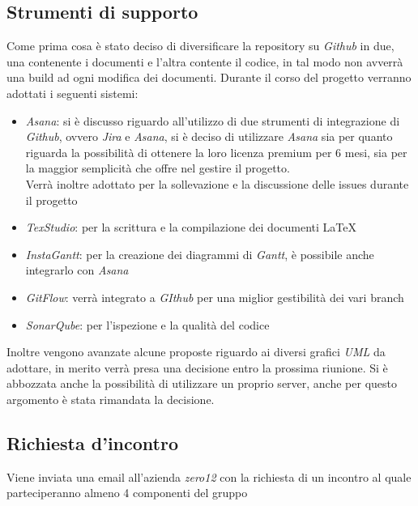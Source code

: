 \documentclass[a4paper,12pt]{article}
\begin{document}
	\subsection{Strumenti di supporto}
	Come prima cosa è stato deciso di diversificare la repository su \textit{Github} in due, una contenente i documenti e l'altra contente il codice, in tal modo non avverrà una build ad ogni modifica dei documenti.
	Durante il corso del progetto verranno adottati i seguenti sistemi:
	\begin{itemize}
		\item\textit{Asana}: si è discusso riguardo all'utilizzo di due strumenti di integrazione di \textit{Github}, ovvero \textit{Jira} e \textit{Asana}, si è deciso di utilizzare \textit{Asana} sia per quanto riguarda la possibilità di ottenere la loro licenza premium per 6 mesi, sia per la maggior semplicità che offre nel gestire il progetto. \\
		Verrà inoltre adottato per la sollevazione e la discussione delle issues durante il progetto
		\item \textit{TexStudio}: per la scrittura e la compilazione dei documenti \LaTeX 
		\item \textit{InstaGantt}: per la creazione dei diagrammi di \textit{Gantt}, è possibile anche integrarlo con \textit{Asana}
		\item \textit{GitFlow}: verrà integrato a \textit{GIthub} per una miglior gestibilità dei vari branch
		\item \textit{SonarQube}: per l'ispezione e la qualità del codice		
	\end{itemize}	
	Inoltre vengono avanzate alcune proposte riguardo ai diversi grafici \textit{UML} da adottare, in merito verrà presa una decisione entro la prossima riunione. Si è abbozzata anche la possibilità di utilizzare un proprio server, anche per questo argomento è stata rimandata la decisione.
	\subsection{Richiesta d'incontro}
	Viene inviata una email all'azienda \textit{zero12} con la richiesta di un incontro al quale parteciperanno almeno 4 componenti del gruppo
\end{document}
